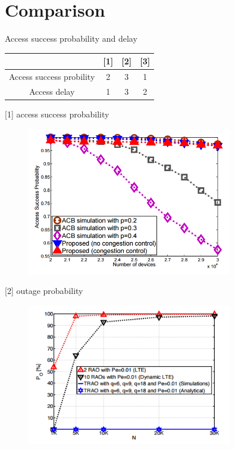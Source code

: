 \documentclass{beamer}
\begin{document}
\section{Comparison}
\begin{frame}{Access success probability and delay}
\begin{center}
\begin{tabular}{|c|c|c|c|}
\hline
                         & {[}1{]} & {[}2{]} & {[}3{]} \\ \hline
Access success probility & 2       & 3       & 1       \\ \hline
Access delay             & 1       & 3       & 2       \\ \hline
\end{tabular}
\end{center}
\end{frame}
\begin{frame}{[1] access success probability}
    \begin{figure}[t]
        \centering
        \includegraphics[width=0.8\textwidth]{figures/asp1.png}
    \end{figure}
\end{frame}
\begin{frame}{[2] outage probability}
    \begin{figure}[t]
        \centering
        \includegraphics[width=0.8\textwidth]{figures/asp2.png}
    \end{figure}
\end{frame}
\end{document}
